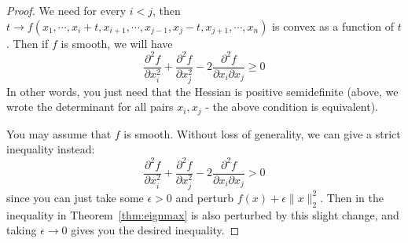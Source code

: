 \begin{proof}
We need for every $i < j$, then $t \to f(x_1, \cdots, x_i + t, x_{i + 1}, \cdots, x_{j - 1}, x_{j} - t, x_{j + 1}, \cdots, x_n)$ is convex as a function of $t$. 
Then if $f$ is smooth, we will have 
\[
\frac{\partial^2 f}{\partial x_i^2} + \frac{\partial^2 f}{\partial x_j^2} - 2 \frac{\partial^2 f}{\partial x_i\partial x_j} \geq 0 
\]
In other words, you just need that the Hessian is positive semidefinite (above, we wrote the determinant for all pairs $x_i, x_j$ - the above condition is equivalent). 

You may assume that $f$ is smooth. Without loss of generality, we can give a strict inequality instead: 
\[
\frac{\partial^2 f}{\partial x_i^2} + \frac{\partial^2 f}{\partial x_j^2} - 2 \frac{\partial^2 f}{\partial x_i\partial x_j} > 0 
\]
since you can just take some $\epsilon > 0$ and perturb $f(x) + \epsilon \|x\|_2^2$. Then in the inequality in Theorem~\ref{thm:eignmax} is also perturbed by this slight change, and taking $\epsilon \to 0$ gives you the desired inequality.


\end{proof}
